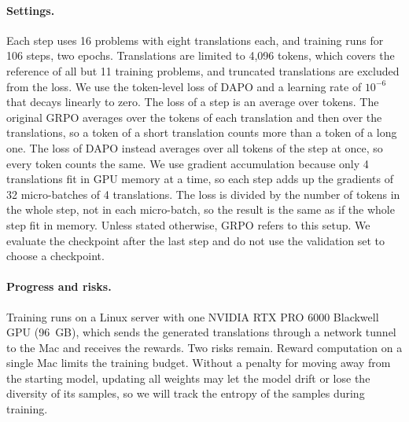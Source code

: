 \documentclass{article}
\begin{document}
\paragraph{Settings.}
Each step uses 16 problems with eight translations each, and training runs for 106 steps, two epochs. Translations are limited to 4{,}096 tokens, which covers the reference of all but 11 training problems, and truncated translations are excluded from the loss. We use the token-level loss of DAPO \citep{dapo} and a learning rate of $10^{-6}$ that decays linearly to zero. The loss of a step is an average over tokens. The original GRPO averages over the tokens of each translation and then over the translations, so a token of a short translation counts more than a token of a long one. The loss of DAPO instead averages over all tokens of the step at once, so every token counts the same. We use gradient accumulation because only 4 translations fit in GPU memory at a time, so each step adds up the gradients of 32 micro-batches of 4 translations. The loss is divided by the number of tokens in the whole step, not in each micro-batch, so the result is the same as if the whole step fit in memory. Unless stated otherwise, GRPO refers to this setup. We evaluate the checkpoint after the last step and do not use the validation set to choose a checkpoint.  

\paragraph{Progress and risks.}
 Training runs on a Linux server with one NVIDIA RTX PRO 6000 Blackwell GPU (96~GB), which sends the generated translations through a network tunnel to the Mac and receives the rewards.  Two risks remain. Reward computation on a single Mac limits the training budget. Without a penalty for moving away from the starting model, updating all weights may let the model drift or lose the diversity of its samples, so we will track the entropy of the samples  during training. 
\end{document}

